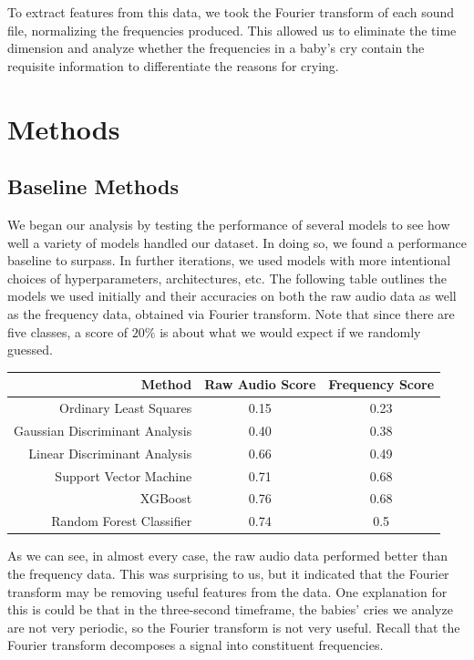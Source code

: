 \documentclass[11pt]{article}
\begin{document}
To extract features from this data, we took the Fourier transform of each sound file, normalizing the frequencies produced.
This allowed us to eliminate the time dimension and analyze whether the frequencies in a baby's cry contain the requisite information to differentiate the reasons for crying.


\section{Methods}
\subsection{Baseline Methods}
We began our analysis by testing the performance of several models to see how well a variety of models handled our dataset.
In doing so, we found a performance baseline to surpass.
In further iterations, we used models with more intentional choices of hyperparameters, architectures, etc.
The following table outlines the models we used initially and their accuracies on both the raw audio data as well as the frequency data, obtained via Fourier transform.
Note that since there are five classes, a score of $20\%$ is about what we would expect if we randomly guessed.
\begin{center}
   \begin{tabular}{| r | c | c |}
      \hline
      \textbf{Method} & \textbf{Raw Audio Score} & \textbf{Frequency Score}  \\
      \hline
      Ordinary Least Squares & 0.15 & 0.23 \\
      Gaussian Discriminant Analysis & 0.40 & 0.38 \\
      Linear Discriminant Analysis & 0.66 & 0.49 \\
      Support Vector Machine & 0.71 &  0.68\\
      XGBoost & 0.76 & 0.68 \\
      Random Forest Classifier & 0.74 & 0.5\\
      \hline
   \end{tabular}
\end{center}
As we can see, in almost every case, the raw audio data performed better than the frequency data.
This was surprising to us, but it indicated that the Fourier transform may be removing useful features from the data.
One explanation for this is could be that in the three-second timeframe, the babies' cries we analyze are not very periodic, so the Fourier transform is not very useful.
Recall that the Fourier transform decomposes a signal into constituent frequencies.
\end{document}
